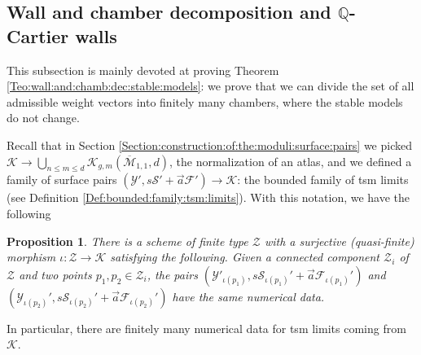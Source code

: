 \documentclass[11pt]{amsart}
\newcommand{\sF}{\mathscr{F}}
\newcommand{\sS}{\mathscr{S}}
\newcommand{\sZ}{\mathscr{Z}}
\newcommand{\Kg}{\mathcal{K}}
\newcommand{\sY}{\mathscr{Y}}
\newtheorem{Prop}[theorem]{Proposition}
\theoremstyle{definition}
\begin{document}
\subsection{Wall and chamber decomposition and $\mathbb{Q}$-Cartier walls}
This subsection is mainly devoted at proving Theorem \ref{Teo:wall:and:chamb:dec:stable:models}: we prove that we can divide the set of all admissible weight vectors into finitely many chambers,
where the stable models do not change. 

Recall that in Section \ref{Section:construction:of:the:moduli:surface:pairs} we picked $\Kg \to \bigcup_{n \le m \le d} \mathcal{K}_{g,m}(\overline{\mathcal{M}}_{1,1},d)$, the normalization of an atlas, and we defined
a family of surface pairs $(\sY',s\sS'+\vec{a}\sF') \to \Kg$: the bounded family of tsm limits (see Definition \ref{Def:bounded:family:tsm:limits}). With this notation, we have the following
\begin{Prop}\label{Prop:stratification:exists}There is a scheme of finite type $\sZ$ with a surjective (quasi-finite) morphism $\iota:\sZ \to \Kg$ satisfying the following. Given a connected component $\sZ_i$ of $\sZ$ and two points $p_1,p_2 \in \sZ_i$, the pairs $(\sY'_{\iota(p_1)},s\sS_{\iota(p_1)}'+\vec{a}\sF_{\iota(p_1)}')$ and 
$(\sY_{\iota(p_2)}',s\sS_{\iota(p_2)}'+\vec{a}\sF_{\iota(p_2)}') $ have the same numerical data.
\end{Prop}
In particular, there are finitely many numerical data for tsm limits coming from $\Kg$.
\end{document}
